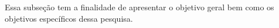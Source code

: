 Essa subseção tem a finalidade de apresentar o objetivo geral bem como os objetivos específicos dessa pesquisa. 
